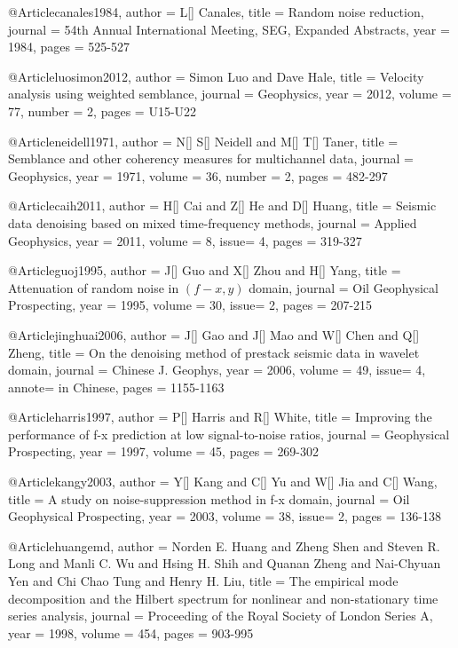@Article{canales1984,
  author = 	 {L[] Canales},
  title = 	 {Random noise reduction},
  journal = 	 {54th Annual International Meeting, SEG, Expanded Abstracts},
  year = 	 1984,
  pages =	 {525-527}
}

@Article{luosimon2012,
  author = 	 {Simon Luo and Dave Hale},
  title = 	 {Velocity analysis using weighted semblance},
  journal = 	 {Geophysics},
  year = 	 2012,
  volume = 	 77,
  number = 	 2,
  pages = 	 {U15-U22}}


@Article{neidell1971,
  author = 	 {N[] S[] Neidell and M[] T[] Taner},
  title = 	 {Semblance and other coherency measures for multichannel data},
  journal = 	 {Geophysics},
  year = 	 1971,
  volume = 	 36,
  number = 	 2,
  pages = 	 {482-297}}


@Article{caih2011,
  author = 	 {H[] Cai and Z[] He and D[] Huang},
  title = 	 {Seismic data denoising based on mixed time-frequency methods},
  journal = 	 {Applied Geophysics},
  year = 	 2011,
  volume =	 8,
  issue= 	 4,
  pages =	 {319-327}
}

@Article{guoj1995,
  author = 	 {J[] Guo and X[] Zhou and H[] Yang},
  title = 	 {Attenuation of random noise in $(f-x,y)$ domain},
  journal = 	 {Oil Geophysical Prospecting},
  year = 	 1995,
  volume =	 30,
  issue=        2,
  pages =	 {207-215}
}

@Article{jinghuai2006,
  author = 	 {J[] Gao and J[] Mao and W[] Chen and Q[] Zheng},
  title = 	 {On the denoising method of prestack seismic data in wavelet domain},
  journal = 	 {Chinese J. Geophys},
  year = 	 2006,
  volume =	 49,
  issue= 	 4,
  annote=        {in Chinese},
  pages =	 {1155-1163}
}

@Article{harris1997,
  author = 	 {P[] Harris and R[] White},
  title = 	 {Improving the performance of f-x prediction at low signal-to-noise ratios},
  journal = 	 {Geophysical Prospecting},
  year = 	 1997,
  volume =	 45,
  pages =	 {269-302}
}


@Article{kangy2003,
  author = 	 {Y[] Kang and C[] Yu and W[] Jia and C[] Wang},
  title = 	 {A study on noise-suppression method in f-x domain},
  journal = 	 {Oil Geophysical Prospecting},
  year = 	 2003,
  volume =	 38,
  issue=        2,
  pages =	 {136-138}
}

@Article{huangemd,
  author = 	 {Norden E. Huang and Zheng Shen and Steven R. Long and Manli C. Wu and Hsing H. Shih and Quanan Zheng and Nai-Chyuan Yen and Chi Chao Tung and Henry H. Liu},
  title = 	 {The empirical mode decomposition and the {Hilbert} spectrum for nonlinear and non-stationary time series analysis},
  journal = 	 {Proceeding of the Royal Society of London Series A},
  year = 	 1998,
  volume = 	 454,
  pages = 	 {903-995}}

